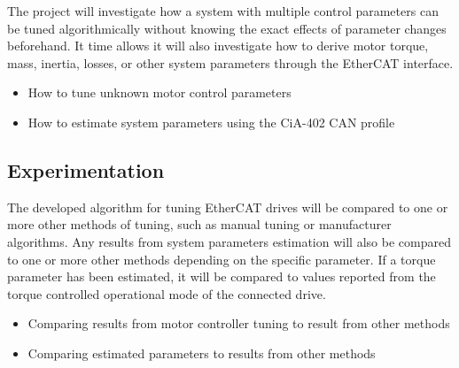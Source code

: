 The project will investigate how a system with multiple control parameters can be tuned algorithmically without knowing the exact effects of parameter changes beforehand. 
It time allows it will also investigate how to derive motor torque, mass, inertia, losses, or other system parameters through the EtherCAT interface.

\begin{itemize}
	\setlength\itemsep{\pdescitemsep}
	\item How to tune unknown motor control parameters
	\item How to estimate system parameters using the CiA-402 CAN profile
\end{itemize}

\subsection{Experimentation}

The developed algorithm for tuning EtherCAT drives will be compared to one or more other methods of tuning, such as manual tuning or manufacturer algorithms.
Any results from system parameters estimation will also be compared to one or more other methods depending on the specific parameter. 
If a torque parameter has been estimated, it will be compared to values reported from the torque controlled operational mode of the connected drive. 

\begin{itemize}
	\setlength\itemsep{\pdescitemsep}
	\item Comparing results from motor controller tuning to result from other methods
	\item Comparing estimated parameters to results from other methods
\end{itemize}

